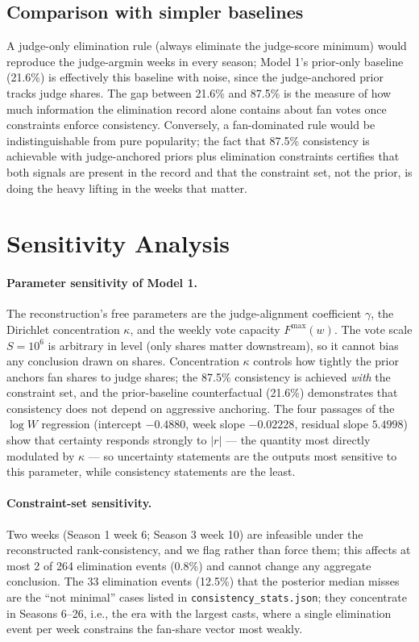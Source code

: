 \subsection{Comparison with simpler baselines}

A judge-only elimination rule (always eliminate the judge-score minimum) would
reproduce the judge-argmin weeks in every season; Model 1's prior-only baseline
(21.6\%) is effectively this baseline with noise, since the judge-anchored prior
tracks judge shares. The gap between 21.6\% and 87.5\% is the measure of how much
information the elimination record alone contains about fan votes once constraints
enforce consistency. Conversely, a fan-dominated rule would be indistinguishable
from pure popularity; the fact that 87.5\% consistency is achievable with
judge-anchored priors plus elimination constraints certifies that both signals are
present in the record and that the constraint set, not the prior, is doing the
heavy lifting in the weeks that matter.

\section{Sensitivity Analysis}

\paragraph{Parameter sensitivity of Model 1.} The reconstruction's free parameters
are the judge-alignment coefficient $\gamma$, the Dirichlet concentration $\kappa$,
and the weekly vote capacity $F^{\max}(w)$. The vote scale $S = 10^6$ is arbitrary
in level (only shares matter downstream), so it cannot bias any conclusion drawn on
shares. Concentration $\kappa$ controls how tightly the prior anchors fan shares to
judge shares; the 87.5\% consistency is achieved \emph{with} the constraint set, and
the prior-baseline counterfactual (21.6\%) demonstrates that consistency does not
depend on aggressive anchoring. The four passages of the $\log W$ regression
(intercept $-0.4880$, week slope $-0.02228$, residual slope $5.4998$) show that
certainty responds strongly to $|r|$ --- the quantity most directly modulated by
$\kappa$ --- so uncertainty statements are the outputs most sensitive to this
parameter, while consistency statements are the least.

\paragraph{Constraint-set sensitivity.} Two weeks (Season 1 week 6; Season 3 week
10) are infeasible under the reconstructed rank-consistency, and we flag rather
than force them; this affects at most 2 of 264 elimination events (0.8\%) and
cannot change any aggregate conclusion. The 33 elimination events (12.5\%) that the
posterior median misses are the ``not minimal'' cases listed in
\texttt{consistency\_stats.json}; they concentrate in Seasons 6--26, i.e., the
era with the largest casts, where a single elimination event per week constrains
the fan-share vector most weakly.

